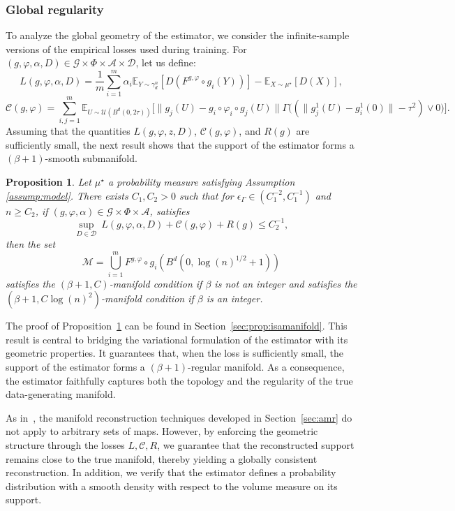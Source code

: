 \documentclass[10pt]{article}
\newtheorem{proposition}{Proposition}
\begin{document}
\subsubsection{Global regularity}
To analyze the global geometry of the estimator, we consider the infinite-sample versions of the empirical losses used during training.
For \( (g, \varphi,\alpha,D) \in \mathcal{G} \times \Phi \times \mathcal{A}\times \mathcal{D} \), let us define:
$$L(g,\varphi,\alpha,D)=\frac{1}{m}\sum_{i=1}^m \alpha_i \mathbb{E}_{Y\sim \gamma_d^n}[ D(F^{g,\varphi}\circ g_{i}(Y))]-\mathbb{E}_{X\sim \mu^\star}[ D(X)],$$
$$
\mathcal{C}(g,\varphi)=\sum_{i,j=1}^m\mathbb{E}_{U\sim \mathcal{U}(B^d(0,2\tau))}\big[\|g_{j}(U)-g_i\circ \varphi_i\circ g_{j}(U)\|\Gamma\big((\|g_j^1(U) - g_i^1(0)\|-\tau^2)\vee 0\big)\big].
$$
Assuming that the quantities \( L(g, \varphi, z, D) \), \( \mathcal{C}(g, \varphi) \), and \( R(g) \) are sufficiently small, the next result shows that the support of the estimator forms a $(\beta+1)$-smooth submanifold.



 \begin{proposition}
\label{prop:isamanifold}Let $\mu^\star$ a probability measure satisfying Assumption \ref{assump:model}. There exists $C_1,C_2>0$ such that for $\epsilon_\Gamma \in (C_1^{-2},C_1^{-1})$ and $n\geq C_2$, if $(g,\varphi,\alpha)\in \mathcal{G}\times  \Phi\times \mathcal{A}$, satisfies $$\sup_{D\in \mathcal{D}} \ L(g,\varphi,\alpha,D)+\mathcal{C}(g,\varphi)+R(g)\leq C_2^{-1},$$ then the set $$\mathcal{M}=\bigcup_{i=1}^m F^{g,\varphi}\circ g_{i}(B^d(0,\log(n)^{1/2}+1))$$ satisfies the $(\beta+1,C)$-manifold condition if $\beta$ is not an integer and satisfies the $(\beta+1,C\log(n)^2)$-manifold condition if $\beta$ is  an integer.    
 \end{proposition}
The proof of Proposition~\ref{prop:isamanifold} can be found in Section~\ref{sec:prop:isamanifold}. This result is central to bridging the variational formulation of the estimator with its geometric properties. It guarantees that, when the loss is sufficiently small, the support of the estimator forms a \( (\beta+1) \)-regular manifold. As a consequence, the estimator faithfully captures both the topology and the regularity of the true data-generating manifold.

As in~\cite{fefferman2015reconstruction}, the manifold reconstruction techniques developed in Section~\ref{sec:amr} do not apply to arbitrary sets of maps. However, by enforcing the geometric structure through the losses \( L, \mathcal{C}, R \), we guarantee that the reconstructed support remains close to the true manifold, thereby yielding a globally consistent reconstruction. In addition, we verify that the estimator defines a probability distribution with a smooth density with respect to the volume measure on its support.
\end{document}
